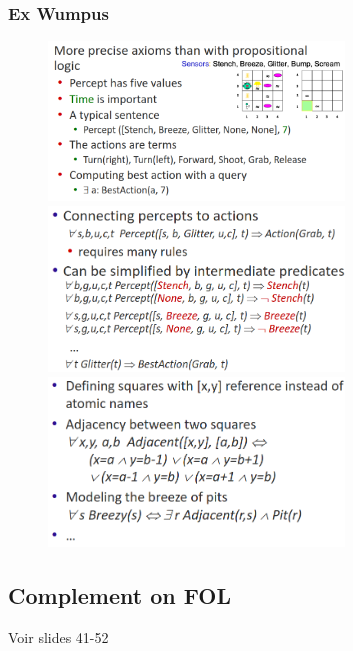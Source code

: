 		\subsubsection{Ex Wumpus}
			\begin{figure}[htp]	
				\centering
				\includegraphics[width=0.7\textwidth]{img/FOL4.png}
				\includegraphics[width=0.7\textwidth]{img/FOL5.png}
				\includegraphics[width=0.7\textwidth]{img/FOL6.png}

			\end{figure}
	\subsection{Complement on FOL}
		Voir slides 41-52
		